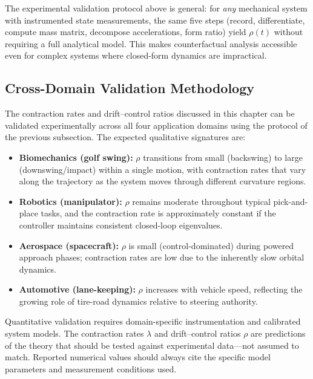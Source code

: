 \begin{designbox}
The experimental validation protocol above is general: for \textit{any} mechanical system with
instrumented state measurements, the same five steps (record, differentiate, compute mass matrix,
decompose accelerations, form ratio) yield $\rho(t)$ without requiring a full analytical model.
This makes counterfactual analysis accessible even for complex systems where closed-form dynamics
are impractical.
\end{designbox}

\subsection{Cross-Domain Validation Methodology}

The contraction rates and drift--control ratios discussed in this chapter can be validated
experimentally across all four application domains using the protocol of the previous
subsection. The expected qualitative signatures are:

\begin{itemize}
\item \textbf{Biomechanics (golf swing):} $\rho$ transitions from small (backswing) to large
      (downswing/impact) within a single motion, with contraction rates that vary along the
      trajectory as the system moves through different curvature regions.
\item \textbf{Robotics (manipulator):} $\rho$ remains moderate throughout typical pick-and-place
      tasks, and the contraction rate is approximately constant if the controller maintains
      consistent closed-loop eigenvalues.
\item \textbf{Aerospace (spacecraft):} $\rho$ is small (control-dominated) during powered
      approach phases; contraction rates are low due to the inherently slow orbital dynamics.
\item \textbf{Automotive (lane-keeping):} $\rho$ increases with vehicle speed, reflecting
      the growing role of tire-road dynamics relative to steering authority.
\end{itemize}

\begin{warningbox}
Quantitative validation requires domain-specific instrumentation and calibrated system
models. The contraction rates $\lambda$ and drift--control ratios $\rho$ are predictions
of the theory that should be tested against experimental data---not assumed to match.
Reported numerical values should always cite the specific model parameters and measurement
conditions used.
\end{warningbox}

